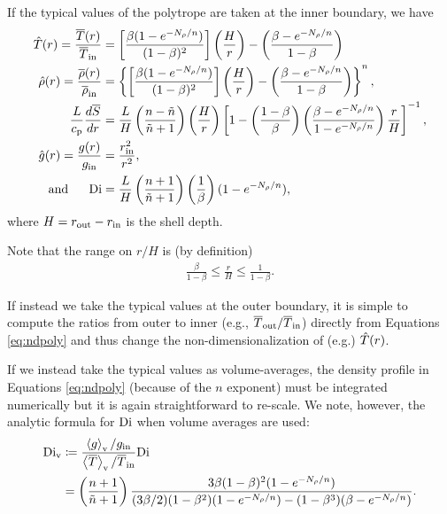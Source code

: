 \documentclass[12pt]{article}
\numberwithin{equation}{section}
\begin{document}
If the typical values of the polytrope are taken at the inner boundary, we have
\begin{subequations}\label{eq:ndpoly}
\begin{align}
	\hat{T}(r) = \frac{\overline{T}(r)}{\overline{T}_{\rm{in}}} &= \left[\frac{\beta(1 - e^{-N_\rho/n})}{(1-\beta)^2 } \right]  \left(\frac{H}{r}\right)  - \left(\frac{ \beta - e^{-N_\rho/n} }{1 - \beta} \right)
	\label{eq:tmppolynd}
	\\
	\hat{\rho}(r) = \frac{\overline{\rho}(r)}{\overline{\rho}_{\rm{in}}} &= \left\{  \left[\frac{\beta(1 - e^{-N_\rho/n})}{(1-\beta)^2 } \right]  \left(\frac{H}{r}\right)  - \left(\frac{ \beta - e^{-N_\rho/n} }{1 - \beta} \right)    \right\}^n,
	\label{eq:rhopolynd}
	\\
	\frac{L}{c_{\rm{p}}}\frac{d\overline{S}}{dr} &=   \frac{L}{H}\left(\frac{n-\tilde{n}}{\tilde{n} + 1} \right) \left(\frac{H}{r}\right) \left[1 - \left( \frac{1-\beta}{\beta} \right)   \left( \frac{\beta - e^{-N_\rho/n}} {1-e^{-N_\rho/n}} \right) \frac{r}{H} \right]^{-1}, 
	\label{eq:dsdrpolynd}
	\\
	\hat{g}(r) = \frac{g(r)}{g_{\rm{in}}} &= \frac{r_{\rm{in}}^2}{r^2},
	\\
	\text{and}\ \ \ \ \  {\rm{Di}} &= \frac{L}{H} \left(\frac{n+1}{\tilde{n}+1}\right)  \left(\frac{1}{\beta} \right) (1 - e^{-N_\rho/n}),
\end{align}
\end{subequations}
where $H=r_{\rm{out}}-r_{\rm{in}}$ is the shell depth. 

Note that the range on $r/H$ is (by definition)
\begin{align}
	\frac{\beta}{1-\beta}\leq \frac{r}{H} \leq \frac{1}{1-\beta}. 
\end{align}

If instead we take the typical values at the outer boundary, it is simple to compute the ratios from outer to inner (e.g., $\overline{T}_{\rm{out}}/\overline{T}_{\rm{in}}$) directly from Equations \eqref{eq:ndpoly} and thus change the non-dimensionalization of (e.g.) $\hat{T}(r)$.

If we instead take the typical values as volume-averages,  the density profile in Equations \eqref{eq:ndpoly} (because of the $n$ exponent) must be integrated numerically but it is again straightforward to re-scale. We note, however, the analytic formula for ${\rm{Di}}$ when volume averages are used: 
\begin{align}\label{eq:digory}
	{\rm{Di}}_{\rm{v}} &\coloneqq \frac{\left\langle g\right\rangle_{\rm{v}}/g_{\rm{in}}}{\left\langle\overline{T}\right\rangle_{\rm{v}}/\overline{T}_{\rm{in}}}{\rm{Di}} \nonumber\\
	&= \left(\frac{n+1}{\tilde{n}+1}\right)   \frac{3 \beta (1 - \beta)^2 (1 - e^{-N_\rho/n})} 
	{ (3\beta/2) (1 - \beta^2) (1 - e^{-N_\rho/n}) - (1-\beta^3)(\beta-e^{-N_\rho/n})}. 
\end{align}
	
\end{document}
